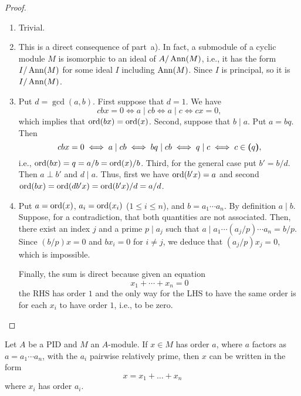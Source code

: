 \begin{proof}${}$
    \begin{enumerate}[\rm a)]
        \item Trivial.
        
        \item This is a direct consequence of part~a). In fact, a submodule of a cyclic module $M$ is isomorphic to an ideal of $A/\operatorname{\operatorname{Ann}}(M)$, i.e., it has the form $I/\operatorname{\operatorname{Ann}}(M)$ for some ideal $I$ including $\operatorname{\operatorname{Ann}}(M)$. Since $I$ is principal, so it is $I/\operatorname{\operatorname{Ann}}(M)$.

        \item Put $d=\gcd(a,b)$. First suppose that $d=1$. We have
        $$
            cbx = 0\iff a\mid cb\iff a\mid c\iff cx=0,
        $$
        which implies that $\operatorname{ord}(bx)=\operatorname{ord}(x)$. Second, suppose that $b\mid a$. Put $a=bq$. Then
        $$
            cbx=0\iff a\mid cb\iff bq\mid cb\iff q\mid c\iff c\in\textrm{\boldmath$($}q\textrm{\boldmath$)$},
        $$
        i.e., $\operatorname{ord}(bx)=q=a/b=\operatorname{ord}(x)/b$. Third, for the general case put $b'=b/d$. Then $a\perp b'$ and $d\mid a$. Thus, first we have $\operatorname{ord}(b'x)=a$ and second $\operatorname{ord}(bx)=\operatorname{ord}(db'x)=\operatorname{ord}(b'x)/d=a/d$.

        \item Put $a=\operatorname{ord}(x)$, $a_i=\operatorname{ord}(x_i)$ ($1\le i\le n$), and $b=a_1\cdots a_n$. By definition $a\mid b$. Suppose, for a contradiction, that both quantities are not associated. Then, there exist an index $j$ and a prime $p\mid a_j$ such that $a\mid a_1\cdots(a_j/p)\cdots a_n=b/p$. Since $(b/p)x=0$ and $bx_i=0$ for $i\ne j$, we deduce that $(a_j/p)x_j=0$, which is impossible.

        Finally, the sum is direct because given an equation
        $$
            x_1+\cdots+x_n=0
        $$
        the RHS has order $1$ and the only way for the LHS to have the same order is for each $x_i$ to have order $1$, i.e., to be zero.
    \end{enumerate}
\end{proof}

\begin{cor}
    Let\/ $A$ be a PID and\/ $M$ an\/ $A$-module. If\/ $x\in M$ has order\/ $a$, where\/ $a$ factors as\/ $a = a_1\cdots a_n$, with the\/ $a_i$ pairwise relatively prime, then\/ $x$ can be written in the form
    $$
        x = x_1 + \dots + x_n
    $$
    where\/ $x_i$ has order\/ $a_i$.
\end{cor}

